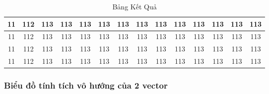 \begin{table}[H]
{\begin{tabular}{|c|c|c|c|c|c|c|c|c|c|c|c|c|c|}
            \hline
            11                  & 112                        & 113                                              & 113                                              & 113                                              & 113                                              & 113                                              & 113                                              & 113                & 113                & 113                & 113                & 113                & 113                \\
            \hline
            11                  & 112                        & 113                                              & 113                                              & 113                                              & 113                                              & 113                                              & 113                                              & 113                & 113                & 113                & 113                & 113                & 113                \\
            \hline
            11                  & 112                        & 113                                              & 113                                              & 113                                              & 113                                              & 113                                              & 113                                              & 113                & 113                & 113                & 113                & 113                & 113                \\
            \hline
            11                  & 112                        & 113                                              & 113                                              & 113                                              & 113                                              & 113                                              & 113                                              & 113                & 113                & 113                & 113                & 113                & 113                \\
            \hline
        \end{tabular}
    }
    \caption{Bảng Kết Quả}
    \label{table:nghia1333}
\end{table}

\newpage
\subsubsection{Biểu đồ tính tích vô hướng của 2 vector}


